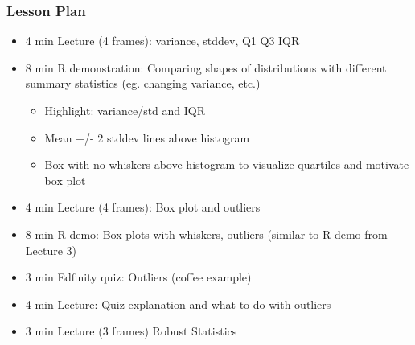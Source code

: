 \begin{frame}
    \frametitle{Lesson Plan}
    \begin{itemize}
        \item 4 min Lecture (4 frames): variance, stddev, Q1 Q3 IQR
        \item 8 min R demonstration: Comparing shapes of distributions with different summary statistics (eg. changing variance, etc.)
        \begin{itemize}
            \item Highlight: variance/std and IQR
            \item Mean +/- 2 stddev lines above histogram
            \item Box with no whiskers above histogram to visualize quartiles and motivate box plot
         \end{itemize}

        \item 4 min Lecture (4 frames): Box plot and outliers
        \item 8 min R demo: Box plots with whiskers, outliers (similar to R demo from Lecture 3)
        \item 3 min Edfinity quiz: Outliers (coffee example)
        \item 4 min Lecture: Quiz explanation and what to do with outliers
        \item 3 min Lecture (3 frames) Robust Statistics 
        

    \end{itemize}
\end{frame}


